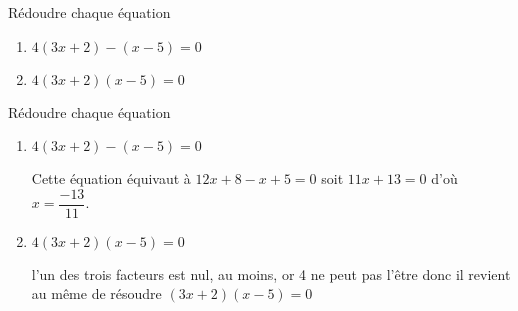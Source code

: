 \begin{exercice*}
    Rédoudre chaque équation
    \begin{enumerate}
        \item $4(3x+2) - (x-5)=0$
        \item $4(3x+2)(x-5)=0$
    \end{enumerate}
\end{exercice*}
\begin{corrige}
    Rédoudre chaque équation

    \begin{enumerate}
        \item $4(3x+2) - (x-5)=0$
        
        Cette équation équivaut à $12x+8-x+5=0$ soit $11x+13=0$ d'où $x=\dfrac{-13}{11}$.
        \item $4(3x+2)(x-5)=0$
        
        l'un des trois facteurs est nul, au moins, or \num{4} ne peut pas l'être donc il revient au même de résoudre $(3x+2)(x-5)=0$
        
    \end{enumerate}
\end{corrige}
